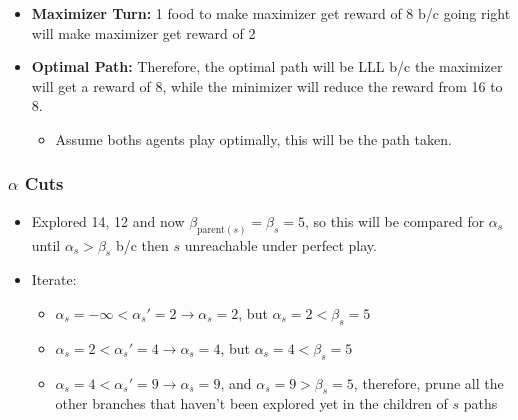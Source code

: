 \begin{example}
\begin{itemize}
\begin{itemize}
            \item \textbf{Maximizer Turn:} 1 food to make maximizer get reward of 8 b/c going right will make maximizer get reward of 2
            \item \textbf{Optimal Path:} Therefore, the optimal path will be LLL b/c the maximizer will get a reward of 8, while the minimizer will reduce the reward from 16 to 8.
            \begin{itemize}
                \item Assume boths agents play optimally, this will be the path taken. 
            \end{itemize}
        \end{itemize}
    \end{itemize}
\end{example}
\newpage

\subsubsection{$\alpha$ Cuts}
\begin{example}
    \begin{itemize}
        \item Explored 14, 12 and now $\beta_{\text{parent}(s)} = \beta_s = 5$, so this will be compared for $\alpha_s$ until $\alpha_s > \beta_s$ b/c then $s$ unreachable under perfect play.
        \item Iterate: 
        \begin{itemize}
            \item $\alpha_s = -\infty < \alpha_s' = 2 \rightarrow \alpha_s = 2$, but $\alpha_s = 2 < \beta_s = 5$ 
            \item $\alpha_s = 2 < \alpha_s' = 4 \rightarrow \alpha_s = 4$, but $\alpha_s = 4 < \beta_s = 5$
            \item $\alpha_s = 4 < \alpha_s' = 9 \rightarrow \alpha_s = 9$, and $\alpha_s = 9 > \beta_s = 5$, therefore, prune all the other branches that haven't been explored yet in the children of $s$ paths
        \end{itemize}
    \end{itemize}
\end{example}

